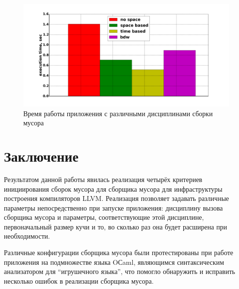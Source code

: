 \documentclass[14pt]{extarticle}
\begin{document}
\begin{figure}[ph]
\caption{\label{pic:perf}Время работы приложения с различными дисциплинами сборки мусора}
\includegraphics[width=1\linewidth]{perf.png}
\end{figure}


\section*{Заключение}
Результатом данной работы явилась реализация
четырёх критериев инициирования сборок мусора для сборщика мусора для инфраструктуры
построения компиляторов LLVM.
Реализация позволяет задавать различные параметры непосредственно при запуске
приложения: дисциплину вызова сборщика мусора и параметры, соответствующие этой
дисциплине, первоначальный размер кучи и то, во сколько раз она будет расширена при необходимости.

Различные конфигурации сборщика мусора были протестированы при работе приложения на
подмножестве языка OСaml, являющимся синтаксическим анализатором для ``игрушечного языка'',
что помогло обнаружить и исправить несколько ошибок в реализации сборщика мусора.

\pagebreak


\end{document}
